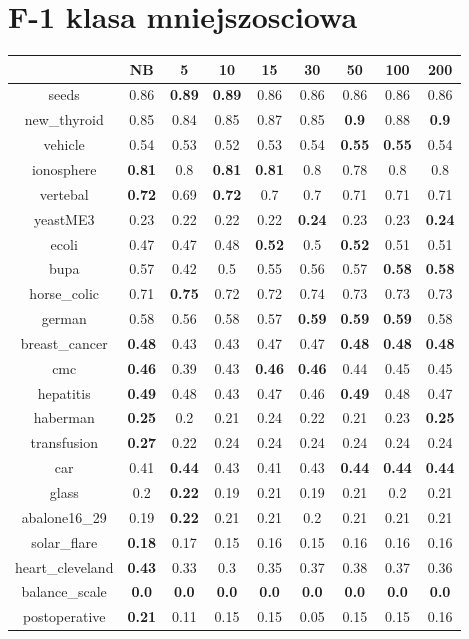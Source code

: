 \documentclass{article}%
\begin{document}
%
\section*{F{-}1 klasa mniejszosciowa}%
\begin{tabular}{c|cccccccc}%
\hline%
&NB&5&10&15&30&50&100&200\\%
\hline%
seeds&0.86&\textbf{0.89}&\textbf{0.89}&0.86&0.86&0.86&0.86&0.86\\%
new\_thyroid&0.85&0.84&0.85&0.87&0.85&\textbf{0.9}&0.88&\textbf{0.9}\\%
vehicle&0.54&0.53&0.52&0.53&0.54&\textbf{0.55}&\textbf{0.55}&0.54\\%
ionosphere&\textbf{0.81}&0.8&\textbf{0.81}&\textbf{0.81}&0.8&0.78&0.8&0.8\\%
vertebal&\textbf{0.72}&0.69&\textbf{0.72}&0.7&0.7&0.71&0.71&0.71\\%
yeastME3&0.23&0.22&0.22&0.22&\textbf{0.24}&0.23&0.23&\textbf{0.24}\\%
ecoli&0.47&0.47&0.48&\textbf{0.52}&0.5&\textbf{0.52}&0.51&0.51\\%
bupa&0.57&0.42&0.5&0.55&0.56&0.57&\textbf{0.58}&\textbf{0.58}\\%
horse\_colic&0.71&\textbf{0.75}&0.72&0.72&0.74&0.73&0.73&0.73\\%
german&0.58&0.56&0.58&0.57&\textbf{0.59}&\textbf{0.59}&\textbf{0.59}&0.58\\%
breast\_cancer&\textbf{0.48}&0.43&0.43&0.47&0.47&\textbf{0.48}&\textbf{0.48}&\textbf{0.48}\\%
cmc&\textbf{0.46}&0.39&0.43&\textbf{0.46}&\textbf{0.46}&0.44&0.45&0.45\\%
hepatitis&\textbf{0.49}&0.48&0.43&0.47&0.46&\textbf{0.49}&0.48&0.47\\%
haberman&\textbf{0.25}&0.2&0.21&0.24&0.22&0.21&0.23&\textbf{0.25}\\%
transfusion&\textbf{0.27}&0.22&0.24&0.24&0.24&0.24&0.24&0.24\\%
car&0.41&\textbf{0.44}&0.43&0.41&0.43&\textbf{0.44}&\textbf{0.44}&\textbf{0.44}\\%
glass&0.2&\textbf{0.22}&0.19&0.21&0.19&0.21&0.2&0.21\\%
abalone16\_29&0.19&\textbf{0.22}&0.21&0.21&0.2&0.21&0.21&0.21\\%
solar\_flare&\textbf{0.18}&0.17&0.15&0.16&0.15&0.16&0.16&0.16\\%
heart\_cleveland&\textbf{0.43}&0.33&0.3&0.35&0.37&0.38&0.37&0.36\\%
balance\_scale&\textbf{0.0}&\textbf{0.0}&\textbf{0.0}&\textbf{0.0}&\textbf{0.0}&\textbf{0.0}&\textbf{0.0}&\textbf{0.0}\\%
postoperative&\textbf{0.21}&0.11&0.15&0.15&0.05&0.15&0.15&0.16\\%
\end{tabular}
\end{document}
